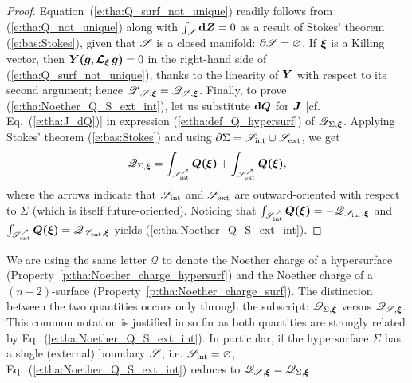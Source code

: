 \begin{proof}
Equation~(\ref{e:tha:Q_surf_not_unique}) readily follows from (\ref{e:tha:Q_not_unique})
along with $\int_{\mathscr{S}} \mathbf{d}\bm{Z} = 0$ as a result of Stokes' theorem (\ref{e:bas:Stokes}),
given that $\mathscr{S}$ is a closed manifold:
$\partial\mathscr{S} = \varnothing$.
If $\bm{\xi}$ is a Killing vector, then
$\bm{Y}\textbf{(}\bm{g},\bm{\mathcal{L}}_{\bm{\xi}}\,\bm{g}\textbf{)} = 0$ in the right-hand side of (\ref{e:tha:Q_surf_not_unique}), thanks to the linearity of $\bm{Y}$ with respect to its
second argument; hence $\mathscr{Q'}_{\mathscr{S},\bm{\xi}} = \mathscr{Q}_{\mathscr{S},\bm{\xi}}$.
Finally, to prove (\ref{e:tha:Noether_Q_S_ext_int}),
let us substitute $\mathbf{d}\bm{Q}$ for $\bm{J}$ [cf. Eq.~(\ref{e:tha:J_dQ})]
in expression (\ref{e:tha:def_Q_hypersurf}) of
$\mathscr{Q}_{\Sigma,\bm{\xi}}$. Applying
Stokes' theorem (\ref{e:bas:Stokes}) and using
$\partial\Sigma = \mathscr{S}_{\rm int} \cup \mathscr{S}_{\rm ext}$, we get
\[
    \mathscr{Q}_{\Sigma,\bm{\xi}} = \int_{\mathscr{S}_{\rm int}^\nearrow} \bm{Q}\textbf{(}\bm{\xi}\textbf{)}
    + \int_{\mathscr{S}_{\rm ext}^\nearrow} \bm{Q}\textbf{(}\bm{\xi}\textbf{)} ,
\]
where the arrows indicate that $\mathscr{S}_{\rm int}$ and  $\mathscr{S}_{\rm ext}$
are outward-oriented with respect to $\Sigma$ (which is itself future-oriented).
Noticing that $\int_{\mathscr{S}_{\rm int}^\nearrow} \bm{Q}\textbf{(}\bm{\xi}\textbf{)} = - \mathscr{Q}_{\mathscr{S}_{\rm int},\bm{\xi}}$
and $\int_{\mathscr{S}_{\rm ext}^\nearrow} \bm{Q}\textbf{(}\bm{\xi}\textbf{)} = \mathscr{Q}_{\mathscr{S}_{\rm ext},\bm{\xi}}$
yields (\ref{e:tha:Noether_Q_S_ext_int}).
\end{proof}

\begin{remark}
We are using the same letter $\mathscr{Q}$ to denote the Noether charge of a hypersurface
(Property~\ref{p:tha:Noether_charge_hypersurf}) and the Noether charge of
a $(n-2)$-surface (Property~\ref{p:tha:Noether_charge_surf}). The distinction between the two quantities
occurs only through the subscript: $\mathscr{Q}_{\Sigma,\bm{\xi}}$ versus $\mathscr{Q}_{\mathscr{S},\bm{\xi}}$.
This common notation is justified in so far as both quantities are strongly related by
Eq.~(\ref{e:tha:Noether_Q_S_ext_int}). In particular, if the hypersurface $\Sigma$ has
a single (external) boundary $\mathscr{S}$, i.e. $\mathscr{S}_{\rm int} = \varnothing$, Eq.~(\ref{e:tha:Noether_Q_S_ext_int}) reduces to
$\mathscr{Q}_{\mathscr{S},\bm{\xi}} = \mathscr{Q}_{\Sigma,\bm{\xi}}$.
\end{remark}

